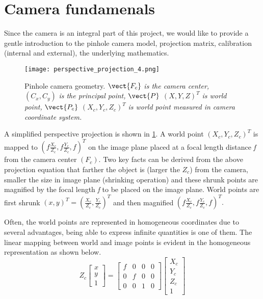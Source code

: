 \section{Camera fundamenals}
Since the camera is an integral part of this project, we would like to provide a gentle introduction to the pinhole camera model, projection matrix, calibration (internal and external), the underlying mathematics.

\begin{figure}[hbt!]
	\centering
	\texttt{[image: perspective\_projection\_4.png]}
	\caption{Pinhole camera geometry. $\vect{F_c}$ \textit{is the camera center,} \textbf{$(C_x, C_y)$} \textit{is the principal point,} $\vect{P}$ \((X, Y, Z)^T\)  \textit{is world point,} $\vect{P_c}$ \((X_c, Y_c, Z_c)^T\) \textit{is world point measured in camera coordinate system.\cite{OpenCV}} }
	\label{fig:perspective projection}
\end{figure}

A simplified perspective projection is shown in \cref{fig:perspective projection}. A world point \( \displaystyle (X_c, Y_c, Z_c)^T\)  is mapped to \( ( \textit{f}\frac{X_c}{Z_c}, \textit{f}\frac{Y_c}{Z_c}, \textit{f} )^T \) on the image plane placed at a focal length distance \textit{f} from the camera center $(F_c)$. Two key facts can be derived from the above projection equation that farther the object is (larger the $Z_c$) from the camera, smaller the size in image plane (shrinking operation) and these shrunk points are magnified by the focal length \textit{f} to be placed on the image plane. World points are first shrunk \( (x, y)^T =  (\frac{X_c}{Z_c}, \frac{Y_c}{Z_c})^T \) and then magnified \( ( \textit{f}\frac{X_c}{Z_c}, \textit{f}\frac{Y_c}{Z_c}, \textit{f} )^T.\)

Often, the world points are represented in homogeneous coordinates due to several advantages, being able to express infinite quantities is one of them. The linear mapping between world and image points is evident in the homogeneous representation as shown below.\\ 

\begin{equation}
Z_c \left[
\begin{array}{c} x\\ y\\ 1 \end{array} 
\right] = 
\begin{bmatrix}
\textit{f} & 0 & 0 & 0 \\
0 & \textit{f} & 0 & 0 \\
0 & 0 & 1 & 0
\end{bmatrix} 
\left[
\begin{array}{c} X_c\\ Y_c\\ Z_c\\ 1 \end{array} 
\right]
\label{eq:mat_image_t_camera}
\end{equation}

